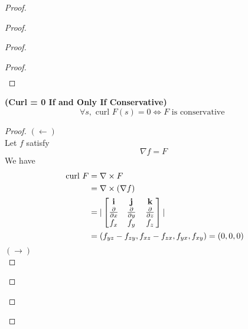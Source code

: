 \documentclass{report}
\begin{document}
\begin{proof}
\begin{proof}
\begin{proof}
\begin{proof}
\begin{align}
\end{align}
\end{proof}
\begin{theorem}
\label{7.2.8}
\textbf{(Curl = 0 If and Only If Conservative)}
\begin{equation}
\forall s, \text{ curl }F(s)=0\iff F\text{ is conservative }
\end{equation}
\end{theorem}
\begin{proof}
$(\longleftarrow)$\\

Let $f$ satisfy
 \begin{equation}
\nabla f=F
\end{equation}
We have
\begin{align}
\text{ curl }F &=\nabla \times F\\
&=\nabla \times (\nabla f)\\
&=|\begin{bmatrix}
    \textbf{ i }&\textbf{ j }&\textbf{ k }\\
    \frac{\partial }{\partial x }&\frac{\partial }{\partial y}&\frac{\partial }{\partial z}\\
  f_x & f_y & f_z
\end{bmatrix}|\\
&=(f_{yz}-f_{zy},f_{xz}-f_{zx},f_{yx},f_{xy})=(0,0,0)
\end{align}
$(\longrightarrow)$\\


\end{proof}
\end{proof}
\end{proof}
\end{proof}
\end{document}
